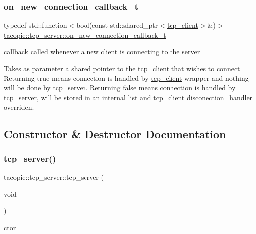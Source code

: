 \subsubsection{\texorpdfstring{on\+\_\+new\+\_\+connection\+\_\+callback\+\_\+t}{on\_new\_connection\_callback\_t}}
{\footnotesize\ttfamily typedef std\+::function$<$bool(const std\+::shared\+\_\+ptr$<$\hyperlink{classtacopie_1_1tcp__client}{tcp\+\_\+client}$>$\&)$>$ \hyperlink{classtacopie_1_1tcp__server_a103cb4e6fcab00f88a708aabd38b66ff}{tacopie\+::tcp\+\_\+server\+::on\+\_\+new\+\_\+connection\+\_\+callback\+\_\+t}}

callback called whenever a new client is connecting to the server

Takes as parameter a shared pointer to the \hyperlink{classtacopie_1_1tcp__client}{tcp\+\_\+client} that wishes to connect Returning true means connection is handled by \hyperlink{classtacopie_1_1tcp__client}{tcp\+\_\+client} wrapper and nothing will be done by \hyperlink{classtacopie_1_1tcp__server}{tcp\+\_\+server}. Returning false means connection is handled by \hyperlink{classtacopie_1_1tcp__server}{tcp\+\_\+server}, will be stored in an internal list and \hyperlink{classtacopie_1_1tcp__client}{tcp\+\_\+client} disconection\+\_\+handler overriden. 

\subsection{Constructor \& Destructor Documentation}
\mbox{\label{classtacopie_1_1tcp__server_a4f67a38a0764924768cbcc7cf68527bf}} 
\subsubsection{\texorpdfstring{tcp\+\_\+server()}{tcp\_server()}\hspace{0.1cm}{\footnotesize\ttfamily [1/2]}}
{\footnotesize\ttfamily tacopie\+::tcp\+\_\+server\+::tcp\+\_\+server (\begin{DoxyParamCaption}\item[{void}]{ }\end{DoxyParamCaption})}



ctor 

\mbox{\label{classtacopie_1_1tcp__server_a7841dc528e2d3dfc94fbe9b93824da50}} 
